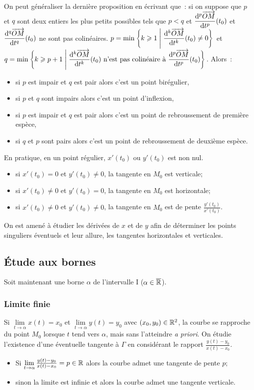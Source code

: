 On peut généraliser la dernière proposition en écrivant que~: si on suppose que
\(p\) et \(q\) sont deux entiers les plus petits possibles tels que \(p<q\) et
\(\dfrac{\mathrm{d}^p \overrightarrow{OM}}{\mathrm{d} t^p}(t_0)\) et \(\dfrac{\mathrm{d}^q \overrightarrow{OM}}{\mathrm{d}
t^q}(t_0)\) ne sont pas colinéaires. \(p = \min\left\{k\geqslant 1\mathrel{}\middle|\mathrel{}\dfrac{\mathrm{d}^k
\overrightarrow{OM}}{\mathrm{d} t^k}(t_0) \neq 0\right\}\) et \(q = \min\left\{k\geqslant p +
1\mathrel{}\middle|\mathrel{}\dfrac{\mathrm{d}^k \overrightarrow{OM}}{\mathrm{d} t^k}(t_0) \text{~n'est pas colinéaire à~}
\dfrac{\mathrm{d}^p \overrightarrow{OM}}{\mathrm{d} t^p}(t_0)\right\}\). Alors~:
\begin{itemize}
  \item si \(p\) est impair et \(q\) est pair alors c'est un point birégulier,
  \item si \(p\) et \(q\) sont impairs alors c'est un point d'inflexion,
  \item si \(p\) est impair et \(q\) est pair alors c'est un point de
    rebroussement de première espèce,
  \item si \(q\) et \(p\) sont pairs alors c'est un point de rebroussement de
    deuxième espèce.
\end{itemize}

En pratique, en un point régulier, \(x'(t_0)\) ou \(y'(t_0)\) est non nul.

\begin{itemize}
  \item si \(x'(t_0)=0\) et \(y'(t_0) \neq 0\), la tangente en \(M_0\) est
    verticale;
  \item si \(x'(t_0) \neq 0\) et \(y'(t_0) = 0\), la tangente en \(M_0\) est
    horizontale;
  \item si \(x'(t_0) \neq 0\) et \(y'(t_0) \neq 0\), la tangente en \(M_0\) est
    de pente \(\frac{y'(t_0)}{x'(t_0)}\).
\end{itemize}
On est amené à étudier les dérivées de \(x\) et de \(y\) afin de déterminer les
points singuliers éventuels et leur allure, les tangentes horizontales et
verticales.

\subsection{Étude aux bornes}
Soit maintenant une borne \(\alpha\) de l'intervalle I (\(\alpha \in
\overline{\mathbb{R}}\)).

\subsubsection{Limite finie}

Si \(\lim\limits_{t \to \alpha}{x(t)}=x_0\) et \(\lim\limits_{t \to
\alpha}{y(t)} = y_0\) avec \((x_0, y_0) \in \mathbb{R}^2\), la courbe se rapproche du
point \(M_0\) lorsque \(t\) tend vers \(\alpha\), mais sans l'atteindre \emph{a
priori}. On étudie l'existence d'une éventuelle tangente à \(\Gamma\) en
considérant le rapport \(\frac{y(t) - y_0}{x(t) - x_0}\).
\begin{itemize}
  \item Si \(\lim\limits_{t \to \alpha}\frac{y(t) - y_0}{x(t) - x_0}=p \in \mathbb{R}\)
    alors la courbe admet une tangente de pente \(p\);
  \item sinon la limite est infinie et alors la courbe admet une tangente
    verticale.
\end{itemize}


